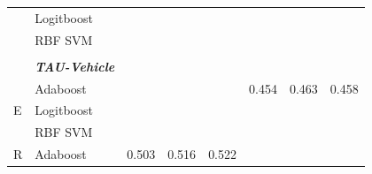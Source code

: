 \documentclass[12pt]{article}
\begin{document}
\begin{sloppypar}
\begin{table}[hbt!]
\begin{tabular}{lllllllll}
                                       & \multicolumn{2}{l}{Logitboost}                            &                                 &                                  &                                  &                                 &                                  &                                  \\
                                       & \multicolumn{2}{l}{RBF SVM}                               & \multicolumn{6}{c}{}                                                                                                                                                                                          \\
                                       &                 &                                         &                                 &                                  &                                  &                                 &                                  &                                  \\
                                       & \multicolumn{2}{l}{\textit{\textbf{TAU-Vehicle}}}         &                                 &                                  &                                  &                                 &                                  &                                  \\
\multirow{3}{*}{E}                     & \multicolumn{2}{l}{Adaboost}                              &                                 &                                  &                                  & 0.454                           & 0.463                            & 0.458                            \\
                                       & \multicolumn{2}{l}{Logitboost}                            &                                 &                                  &                                  &                                 &                                  &                                  \\
                                       & \multicolumn{2}{l}{RBF SVM}                               & \multicolumn{6}{c}{}                                                                                                                                                                                          \\
\multirow{3}{*}{R}                     & \multicolumn{2}{l}{Adaboost}                              & 0.503                           & 0.516                            & 0.522                            &                                 &                                  &                                  \\

\end{tabular}
\end{table}
\end{sloppypar}
\end{document}

